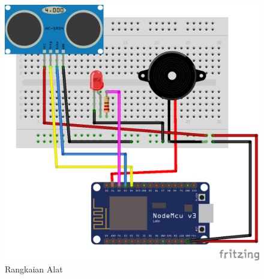 \begin{figure}[H]
\centering
\includegraphics[width=1\textwidth]{figures/rangkaian.png}
\caption{Rangkaian Alat  }
\label{print}
\end{figure}

